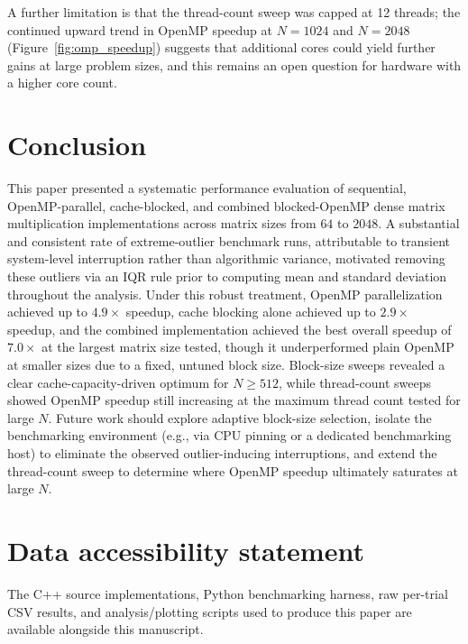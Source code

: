 \documentclass[11pt]{article}
\begin{document}
A further limitation is that the thread-count sweep was capped at 12 threads; the continued upward trend in OpenMP speedup at $N=1024$ and $N=2048$ (Figure~\ref{fig:omp_speedup}) suggests that additional cores could yield further gains at large problem sizes, and this remains an open question for hardware with a higher core count.

\section{Conclusion}
\label{sec:conclusion}

This paper presented a systematic performance evaluation of sequential, OpenMP-parallel, cache-blocked, and combined blocked-OpenMP dense matrix multiplication implementations across matrix sizes from $64$ to $2048$. A substantial and consistent rate of extreme-outlier benchmark runs, attributable to transient system-level interruption rather than algorithmic variance, motivated removing these outliers via an IQR rule prior to computing mean and standard deviation throughout the analysis. Under this robust treatment, OpenMP parallelization achieved up to $4.9\times$ speedup, cache blocking alone achieved up to $2.9\times$ speedup, and the combined implementation achieved the best overall speedup of $7.0\times$ at the largest matrix size tested, though it underperformed plain OpenMP at smaller sizes due to a fixed, untuned block size. Block-size sweeps revealed a clear cache-capacity-driven optimum for $N \geq 512$, while thread-count sweeps showed OpenMP speedup still increasing at the maximum thread count tested for large $N$. Future work should explore adaptive block-size selection, isolate the benchmarking environment (e.g., via CPU pinning or a dedicated benchmarking host) to eliminate the observed outlier-inducing interruptions, and extend the thread-count sweep to determine where OpenMP speedup ultimately saturates at large $N$.

\section*{Data accessibility statement}
The C++ source implementations, Python benchmarking harness, raw per-trial CSV results, and analysis/plotting scripts used to produce this paper are available alongside this manuscript.
\end{document}
